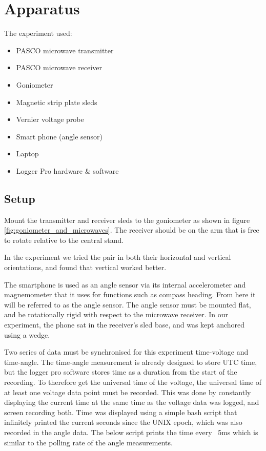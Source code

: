 \section*{Apparatus}

The experiment used:
\begin{itemize}
\item PASCO microwave transmitter
\item PASCO microwave receiver
\item Goniometer
\item Magnetic strip plate sleds
\item Vernier voltage probe
\item Smart phone (angle sensor)
\item Laptop
\item Logger Pro hardware \& software
\end{itemize}

\subsection*{Setup}

Mount the transmitter and receiver sleds to the goniometer as shown in figure \ref{fig:goniometer_and_microwaves}. The receiver should be on the arm that is free to rotate relative to the central stand.

In the experiment we tried the pair in both their horizontal and vertical orientations, and found that vertical worked better.

The smartphone is used as an angle sensor via its internal accelerometer and magnemometer that it uses for functions such as compass heading. From here it will be referred to as the angle sensor. The angle sensor must be mounted flat, and be rotationally rigid with respect to the microwave receiver. In our experiment, the phone sat in the receiver's sled base, and was kept anchored using a wedge.

Two series of data must be synchronised for this experiment \textemdash time-voltage and time-angle. The time-angle measurement is already designed to store UTC time, but the logger pro software stores time as a duration from the start of the recording. To therefore get the universal time of the voltage, the universal time of at least one voltage data point must be recorded. This was done by constantly displaying the current time at the same time as the voltage data was logged, and screen recording both. Time was displayed using a simple bash script that infinitely printed the current seconds since the UNIX epoch, which was also recorded in the angle data. The below script prints the time every ~5ms which is similar to the polling rate of the angle measurements.


